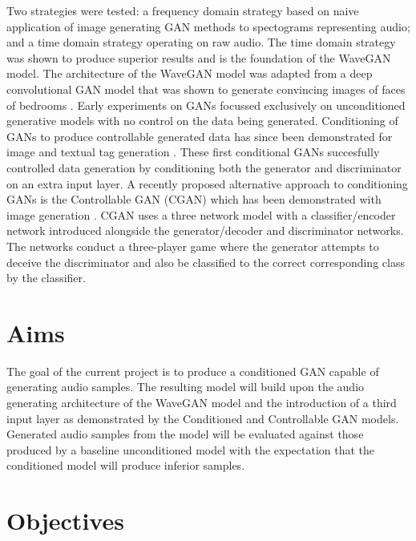 \documentclass[a4paper, titlepage]{article}
\begin{document}
Two strategies were tested: a frequency domain strategy based on naive application of image generating GAN methods to spectograms representing audio; and a time domain strategy operating on raw audio.
The time domain strategy was shown to produce superior results and is the foundation of the WaveGAN model.
The architecture of the WaveGAN model was adapted from a deep convolutional GAN model that was shown to generate convincing images of faces of bedrooms \cite{2015arXiv151106434R}.
\newline
\newline
Early experiments on GANs focussed exclusively on unconditioned generative models with no control on the data being generated.
Conditioning of GANs to produce controllable generated data has since been demonstrated for image and textual tag generation \cite{2014arXiv1411.1784M}.
These first conditional GANs succesfully controlled data generation by conditioning both the generator and discriminator on an extra input layer.
\newline
\newline
A recently proposed alternative approach to conditioning GANs is the Controllable GAN (CGAN) which has been demonstrated with image generation \cite{2017arXiv170800598L}.
CGAN uses a three network model with a classifier/encoder network introduced alongside the generator/decoder and discriminator networks.
The networks conduct a three-player game where the generator attempts to deceive the discriminator and also be classified to the correct corresponding class by the classifier.

\newpage

\section{Aims}

The goal of the current project is to produce a conditioned GAN capable of generating audio samples.
The resulting model will build upon the audio generating architecture of the WaveGAN model and the introduction of a third input layer as demonstrated by the Conditioned and Controllable GAN models.
Generated audio samples from the model will be evaluated against those produced by a baseline unconditioned model with the expectation that the conditioned model will produce inferior samples.

\newpage

\section{Objectives}
\end{document}
